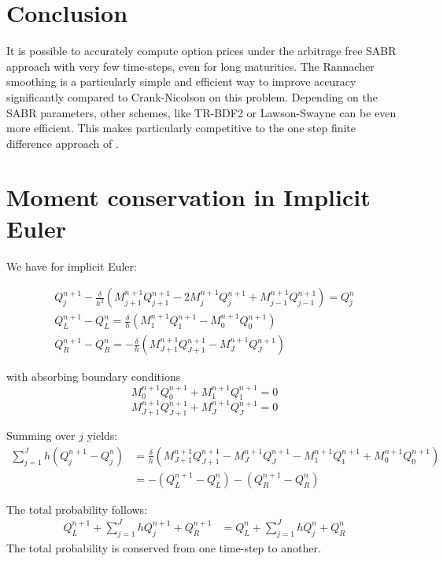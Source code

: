 \documentclass[]{rAMF2e}
\begin{document}
\section{Conclusion}
It is possible to accurately compute option prices under the arbitrage free SABR approach with very few time-steps, even for long maturities. The Rannacher smoothing is a particularly simple and efficient way to improve accuracy significantly compared to Crank-Nicolson on this problem. Depending on the SABR parameters, other schemes, like TR-BDF2 or Lawson-Swayne can be even more efficient.
This makes \citep{hagan2013arbitrage} particularly competitive to the one step finite difference approach of \citep{andreasen2011zabr}.

%

\newpage
\appendix
\section{Moment conservation in Implicit Euler}
We have for implicit Euler:

\begin{eqnarray}
Q_j^{n+1} - \frac{\delta}{h^2}\left(M_{j+1}^{n+1}Q_{j+1}^{n+1}-2M_j^{n+1}Q_j^{n+1}+M_{j-1}^{n+1}Q_{j-1}^{n+1}\right) = Q_j^n \\
Q_L^{n+1}-Q_L^n = \frac{\delta}{h}\left(M_1^{n+1}Q_1^{n+1}-M_0^{n+1}Q_0^{n+1}\right)\\
Q_R^{n+1}-Q_R^n = -\frac{\delta}{h}\left(M_{J+1}^{n+1}Q_{J+1}^{n+1}-M_{J}^{n+1}Q_J^{n+1}\right)
\end{eqnarray}

with absorbing boundary conditions
$$M_0^{n+1}Q_0^{n+1} + M_1^{n+1}Q_1^{n+1} = 0 $$
$$M_{J+1}^{n+1}Q_{J+1}^{n+1} + M_J^{n+1}Q_J^{n+1} = 0 $$

Summing over $j$ yields:
\begin{align}
\sum_{j=1}^{J} h (Q_j^{n+1}-Q_j^n) &= \frac{\delta}{h}\left(M_{J+1}^{n+1}Q_{J+1}^{n+1}-M_J^{n+1}Q_J^{n+1}-M_1^{n+1}Q_1^{n+1}+M_0^{n+1}Q_0^{n+1}\right)\\
&= -(Q_L^{n+1}-Q_L^n)-(Q_R^{n+1}-Q_R^n)
\end{align}

The total probability follows:
\begin{align}
Q_L^{n+1}+\sum_{j=1}^J hQ_j^{n+1} + Q_R^{n+1} &= Q_L^{n}+\sum_{j=1}^J hQ_j^{n} + Q_R^{n} 
\end{align}
The total probability is conserved from one time-step to another.
\end{document}
